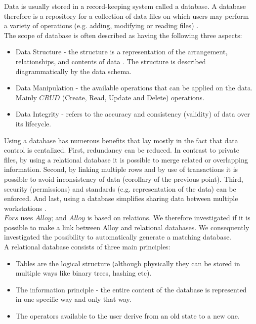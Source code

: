 \documentclass[oneside]{book}
\begin{document}
Data is usually stored in a record-keeping system called a database. A database therefore is a repository for a collection of data files on which users may perform a variety of operations (e.g. adding, modifying or reading files) \cite[p.~11]{introtodb}.\\

The scope of database is often described as having the following three aspects:
\begin{itemize}
  \item Data Structure - the structure is a representation of the arrangement, relationships, and contents of data \cite{datastruct}. The structure is described diagrammatically by the data schema.  
  \item Data Manipulation - the available operations that can be applied on the data. Mainly $CRUD$ (Create, Read, Update and Delete) operations.
  \item Data Integrity - refers to the accuracy and consistency (validity) of data over its lifecycle.
\end{itemize}

Using a database has numerous benefits that lay mostly in the fact that data control is centalized. First, redundancy can be reduced. In contrast to private files, by using a relational database it is possible to merge related or overlapping information. Second, by linking multiple rows and by use of transactions it is possible to avoid inconsistency of data (corollary of the previous point). Third, security (permissions) and standards (e.g. representation of the data) can be enforced. And last, using a database simplifies sharing data between multiple workstations \cite[p.~16]{introtodb}.\\

$Fors$ uses $Alloy$; and $Alloy$ is based on relations. We therefore investigated if it is possible to make a link between Alloy and relational databases. We consequently investigated the possibility to automatically generate a matching database. \\

A relational database consists of three main principles:
\begin{itemize}
	\item Tables are the logical structure (although physically they can be stored in multiple ways like binary trees, hashing etc). 
	\item The information principle - the entire content of the database is represented in one specific way and only that way. 
	\item The operators available to the user derive from an old state to a new one.
\end{itemize}
\end{document}
